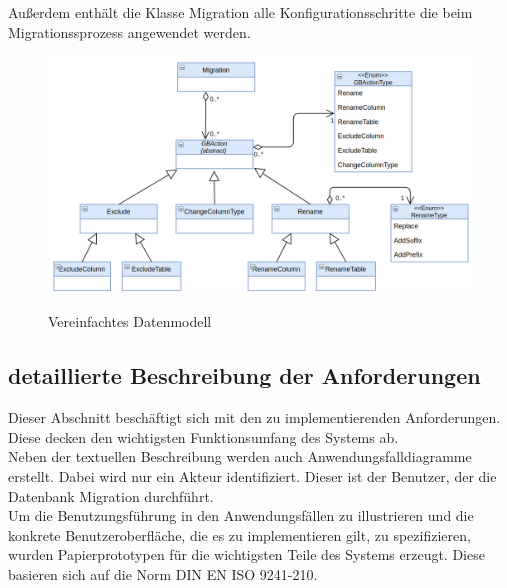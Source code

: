 Außerdem enthält die Klasse Migration alle Konfigurationsschritte die beim Migrationssprozess angewendet werden.
\begin{figure}[H]
	\caption{Vereinfachtes Datenmodell}
	\centering
	\includegraphics[width=\textwidth]{images/sichten/abstract-datenmodell}
	\label{img:abstract-datenmodell}
\end{figure}






\subsection{detaillierte Beschreibung der Anforderungen}
Dieser Abschnitt beschäftigt sich mit den zu implementierenden Anforderungen. Diese decken den wichtigsten Funktionsumfang des Systems ab.\\
Neben der textuellen Beschreibung werden auch Anwendungsfalldiagramme erstellt. Dabei wird nur ein Akteur identifiziert. Dieser ist der Benutzer, der die Datenbank Migration durchführt. \\
Um die Benutzungsführung in den Anwendungsfällen zu illustrieren und die konkrete Benutzeroberfläche, die es zu implementieren gilt, zu spezifizieren, wurden Papierprototypen für die wichtigsten Teile des Systems erzeugt. Diese basieren sich auf die Norm DIN EN ISO 9241-210.




